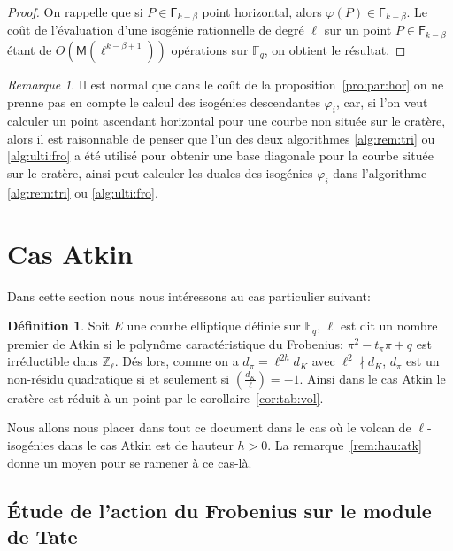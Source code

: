 \documentclass[10pt,a4paper]{book}
\theoremstyle{plain}
\theoremstyle{definition}
\theoremstyle{definition}
\theoremstyle{definition}
\theoremstyle{definition}
\theoremstyle{definition}
\newtheorem{defi}[thm]{Définition}
\theoremstyle{remark}
\newtheorem{rem}[thm]{Remarque}
\theoremstyle{remark}
\theoremstyle{definition}
\begin{document}
\begin{proof}
On rappelle que si $P \in \mathsf{F}_{k-\beta}$ point horizontal, alors 
$\varphi(P) \in \mathsf{F}_{k-\beta}$. Le coût de l'évaluation d'une isogénie 
rationnelle de degré $\ell$ sur un point $P \in \mathsf{F}_{k-\beta}$ étant de 
$O(\mathsf{M}(\ell^{k-\beta+1}))$ opérations sur $\mathbb{F}_q$, on obtient le résultat.
\end{proof}

\begin{rem}
Il est normal que dans le coût de la proposition~\ref{pro:par:hor} on ne prenne
pas en compte le calcul des isogénies descendantes $\varphi_i$, car, si l'on 
veut calculer un point ascendant horizontal pour une courbe non située sur 
le cratère, alors il est raisonnable de penser que l'un des deux algorithmes 
\ref{alg:rem:tri} ou \ref{alg:ulti:fro} a été utilisé pour obtenir une base 
diagonale pour la courbe située sur le cratère, ainsi peut calculer les duales 
des isogénies $\varphi_i$ dans l'algorithme \ref{alg:rem:tri} ou \ref{alg:ulti:fro}.
\end{rem}
\section{Cas Atkin}
\label{subs:atk:dir}
Dans cette section nous nous intéressons au cas particulier suivant: 
\begin{defi}
\label{def:cas:atk}
Soit $E$ une courbe elliptique définie sur $\mathbb{F}_q$, $\ell$ est dit un 
nombre premier de Atkin si le polynôme caractéristique du Frobenius: 
$\pi^2-t_{\pi}\pi + q$ est irréductible dans $\mathbb{Z}_{\ell}$. Dés lors, 
comme on a $d_{\pi}=\ell^{2h}d_{K}$ avec $\ell^2 \nmid d_{K}$, 
$d_{\pi}$ est un non-résidu quadratique si et seulement si $\left( 
\frac{d_{K}}{\ell} \right)=-1$. Ainsi dans le cas Atkin le cratère est réduit à
un point par le corollaire~\ref{cor:tab:vol}.
\end{defi}

Nous allons nous placer dans tout ce document dans le cas où le volcan de
$\ell$-isogénies dans le cas Atkin est de hauteur $h>0$. La 
remarque~\ref{rem:hau:atk} donne un moyen pour se ramener à ce cas-là.

\subsection{\'Etude de l'action du Frobenius sur le module de Tate}
\end{document}
